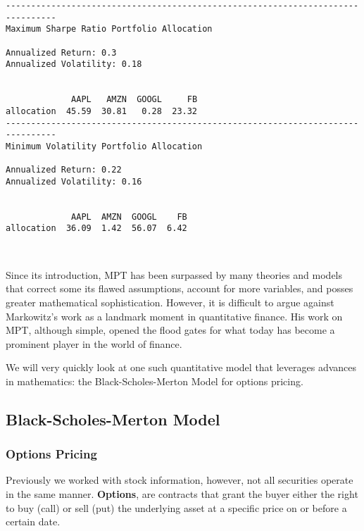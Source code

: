 \documentclass[11pt]{article}
\begin{document}
    \begin{Verbatim}[commandchars=\\\{\}]
--------------------------------------------------------------------------------
Maximum Sharpe Ratio Portfolio Allocation

Annualized Return: 0.3
Annualized Volatility: 0.18


             AAPL   AMZN  GOOGL     FB
allocation  45.59  30.81   0.28  23.32
--------------------------------------------------------------------------------
Minimum Volatility Portfolio Allocation

Annualized Return: 0.22
Annualized Volatility: 0.16


             AAPL  AMZN  GOOGL    FB
allocation  36.09  1.42  56.07  6.42
    \end{Verbatim}

    \begin{center}
    \end{center}
    { \hspace*{\fill} \\}
    
    Since its introduction, MPT has been surpassed by many theories and
models that correct some its flawed assumptions, account for more
variables, and posses greater mathematical sophistication. However, it
is difficult to argue against Markowitz's work as a landmark moment in
quantitative finance. His work on MPT, although simple, opened the flood
gates for what today has become a prominent player in the world of
finance.

We will very quickly look at one such quantitative model that leverages
advances in mathematics: the Black-Scholes-Merton Model for options
pricing.

    \hypertarget{black-scholes-merton-model}{%
\subsection{Black-Scholes-Merton
Model}\label{black-scholes-merton-model}}

\hypertarget{options-pricing}{%
\subsubsection{Options Pricing}\label{options-pricing}}

Previously we worked with stock information, however, not all securities
operate in the same manner. \textbf{Options}, are contracts that grant
the buyer either the right to buy (call) or sell (put) the underlying
asset at a specific price on or before a certain date.
\end{document}
